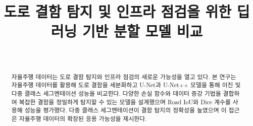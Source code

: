 \documentclass[a4paper, 10pt, conference]{ieeeconf}
\title{\LARGE \bf
도로 결함 탐지 및 인프라 점검을 위한 딥러닝 기반 분할 모델 비교
}
\author{
    \IEEEauthorblockN{Jonghwan Kim$^{1}$}\\ %
    \IEEEauthorblockA{$^{1}$Aiffel Online Research 9기\\ %
    Email: kkk00012120@gmail.com} %
}
\begin{document}
\maketitle



\begin{abstract}
자율주행 데이터는 도로 결함 탐지와 인프라 점검의 새로운 가능성을 열고 있다. 본 연구는 자율주행 데이터를 활용해 도로 결함을 세분화하고 U-Net과 U-Net++ 모델을 통해 이진 및 다중 클래스 세그멘테이션 성능을 비교한다. 다양한 손실 함수와 데이터 증강 기법을 결합하여 복잡한 결함을 정밀하게 탐지할 수 있는 모델을 설계했으며 Road IoU와 Dice 계수를 사용해 성능을 평가했다. 다중 클래스 세그멘테이션이 결함 탐지의 정확성을 높였으며 이 접근은 자율주행 데이터의 확장된 응용 가능성을 제시한다.
\end{abstract}









\end{document}
